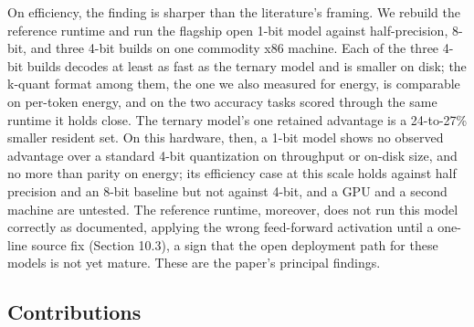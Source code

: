 \documentclass[11pt]{article}
\begin{document}
On efficiency, the finding is sharper than the literature's framing. We rebuild the
reference runtime and run the flagship open 1-bit model against half-precision, 8-bit,
and three 4-bit builds on one commodity x86 machine. Each of the three 4-bit builds
decodes at least as fast as the ternary model and is smaller on disk; the k-quant format
among them, the one we also measured for energy, is comparable on per-token energy, and
on the two accuracy tasks scored through the same runtime it holds close. The ternary
model's one retained advantage is a 24-to-27\% smaller resident set. On
this hardware, then, a 1-bit model shows no observed advantage over a standard 4-bit
quantization on
throughput or on-disk size, and no more than parity on energy; its efficiency case at
this scale holds against half precision and an 8-bit baseline but not against 4-bit, and
a GPU and a second machine are untested. The
reference runtime, moreover, does not run this model correctly as documented, applying
the wrong feed-forward activation until a one-line source fix (Section 10.3), a sign that
the open deployment path for these models is not yet mature. These are the paper's
principal findings.

\subsection{Contributions}
\end{document}
